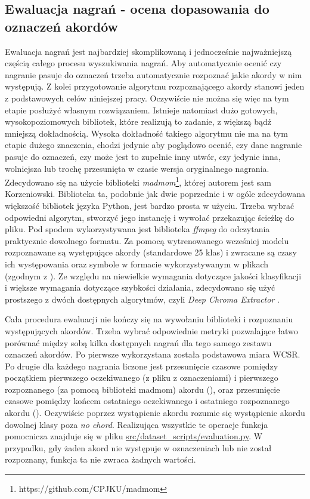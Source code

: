 \subsection{Ewaluacja nagrań - ocena dopasowania do oznaczeń akordów}
Ewaluacja nagrań jest najbardziej skomplikowaną i jednocześnie najważniejszą częścią całego procesu
wyszukiwania nagrań. Aby automatycznie ocenić czy nagranie pasuje do oznaczeń trzeba automatycznie
rozpoznać jakie akordy w nim występują. Z kolei przygotowanie algorytmu rozpoznającego akordy
stanowi jeden z podstawowych celów niniejszej pracy. Oczywiście nie można się więc na tym etapie
posłużyć własnym rozwiązaniem. Istnieje natomiast dużo gotowych, wysokopoziomowych bibliotek, które
realizują to zadanie, z większą bądź mniejszą dokładnością. Wysoka dokładność takiego algorytmu nie
ma na tym etapie dużego znaczenia, chodzi jedynie aby poglądowo ocenić, czy dane nagranie pasuje do
oznaczeń, czy może jest to zupełnie inny utwór, czy jedynie inna, wolniejsza lub trochę przesunięta
w czasie wersja oryginalnego nagrania. Zdecydowano się na użycie biblioteki
\emph{madmom}\footnote{https://github.com/CPJKU/madmom}, której autorem jest sam Korzeniowski.
Biblioteka ta, podobnie jak dwie poprzednie i w ogóle zdecydowana większość bibliotek języka Python,
jest bardzo prosta w użyciu. Trzeba wybrać odpowiedni algorytm, stworzyć jego instancję i wywołać
przekazując ścieżkę do pliku. Pod spodem wykorzystywana jest biblioteka \emph{ffmpeg} do odczytania
praktycznie dowolnego formatu. Za pomocą wytrenowanego wcześniej modelu rozpoznawane są występujące
akordy (standardowe 25 klas) i zwracane są czasy ich występowania oraz symbole w formacie
wykorzystywanym w plikach  (zgodnym z \cite{harte_towards_nodate}). Ze względu na
niewielkie wymagania dotyczące jakości klasyfikacji i większe wymagania dotyczące szybkości
działania, zdecydowano się użyć prostszego z dwóch dostępnych algorytmów, czyli \emph{Deep Chroma
Extractor} \cite{korzeniowski_feature_2016}.

Cała procedura ewaluacji nie kończy się na wywołaniu biblioteki i rozpoznaniu występujących akordów.
Trzeba wybrać odpowiednie metryki pozwalające łatwo porównać między sobą kilka dostępnych nagrań dla
tego samego zestawu oznaczeń akordów. Po pierwsze wykorzystana została podstawowa miara WCSR. Po drugie
dla każdego nagrania liczone jest przesunięcie czasowe pomiędzy początkiem pierwszego oczekiwanego
(z pliku z oznaczeniami) i pierwszego rozpoznanego (za pomocą biblioteki madmom) akordu
(), oraz przesunięcie czasowe pomiędzy końcem ostatniego oczekiwanego i ostatniego
rozpoznanego akordu (). Oczywiście poprzez wystąpienie akordu rozumie się
wystąpienie akordu dowolnej klasy poza \emph{no chord}. Realizująca wszystkie te operacje funkcja
pomocnicza znajduje się w pliku \url{src/dataset\_scripts/evaluation.py}. W przypadku, gdy żaden akord
nie występuje w oznaczeniach lub nie został rozpoznany, funkcja ta nie zwraca żadnych wartości.

